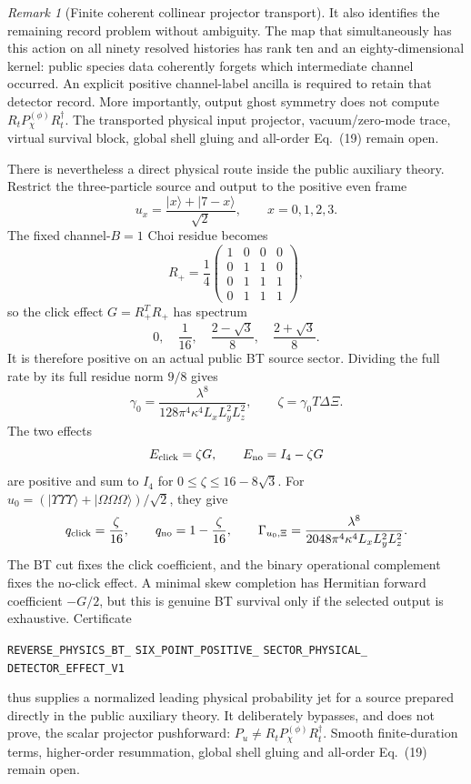 \documentclass[11pt]{article}
\theoremstyle{definition}
\theoremstyle{remark}
\newtheorem{remark}[theorem]{Remark}
\begin{document}
\begin{remark}[Finite coherent collinear projector transport]
It also identifies the remaining record problem without ambiguity.  The map
that simultaneously has this action on all ninety resolved histories has
rank ten and an eighty-dimensional kernel: public species data coherently
forgets which intermediate channel occurred.  An explicit positive
channel-label ancilla is required to retain that detector record.  More
importantly, output ghost symmetry does not compute
$R_tP_\chi^{(\phi)}R_t^\dagger$.  The transported physical input projector,
vacuum/zero-mode trace, virtual survival block, global shell gluing and
all-order Eq.~(19) remain open.

There is nevertheless a direct physical route inside the public auxiliary
theory.  Restrict the three-particle source and output to the positive even
frame
\[
 u_x=\frac{|x\rangle+|7-x\rangle}{\sqrt2},
 \qquad x=0,1,2,3.
\]
The fixed channel-$B=1$ Choi residue becomes
\[
 R_+=\frac14\begin{pmatrix}
 1&0&0&0\\0&1&1&0\\0&1&1&1\\0&1&1&1
 \end{pmatrix},
\]
so the click effect $G=R_+^TR_+$ has spectrum
\[
 0,\quad\frac1{16},\quad
 \frac{2-\sqrt3}{8},\quad\frac{2+\sqrt3}{8}.
\]
It is therefore positive on an actual public BT source sector.  Dividing the
full rate by its full residue norm $9/8$ gives
\[
 \gamma_0=\frac{\lambda^8}
 {128\pi^4\kappa^4L_xL_y^2L_z^2},
 \qquad \zeta=\gamma_0T\Delta\Xi.
\]
The two effects
\[
 E_{\rm click}=\zeta G,\qquad E_{\rm no}=I_4-\zeta G
\]
are positive and sum to $I_4$ for
$0\leq\zeta\leq16-8\sqrt3$.  For
$u_0=(|\Upsilon\Upsilon\Upsilon\rangle+
|\Omega\Omega\Omega\rangle)/\sqrt2$, they give
\[
 q_{\rm click}=\frac\zeta{16},\qquad
 q_{\rm no}=1-\frac\zeta{16},
 \qquad
 \Gamma_{u_0,\Xi}=\frac{\lambda^8}
 {2048\pi^4\kappa^4L_xL_y^2L_z^2}.
\]
The BT cut fixes the click coefficient, and the binary operational complement
fixes the no-click effect.  A minimal skew completion has Hermitian forward
coefficient $-G/2$, but this is genuine BT survival only if the selected
output is exhaustive.  Certificate
\par\noindent
\texttt{REVERSE\_PHYSICS\_BT\_}
\allowbreak\texttt{SIX\_POINT\_POSITIVE\_}
\allowbreak\texttt{SECTOR\_PHYSICAL\_}
\allowbreak\texttt{DETECTOR\_EFFECT\_V1}
\par\noindent
thus supplies a normalized leading physical probability jet for a source
prepared directly in the public auxiliary theory.  It deliberately bypasses,
and does not prove, the scalar projector pushforward:
\(P_u\ne R_tP_\chi^{(\phi)}R_t^\dagger\).
Smooth finite-duration terms, higher-order
resummation, global shell gluing and all-order Eq.~(19) remain open.


\end{remark}
\end{document}
